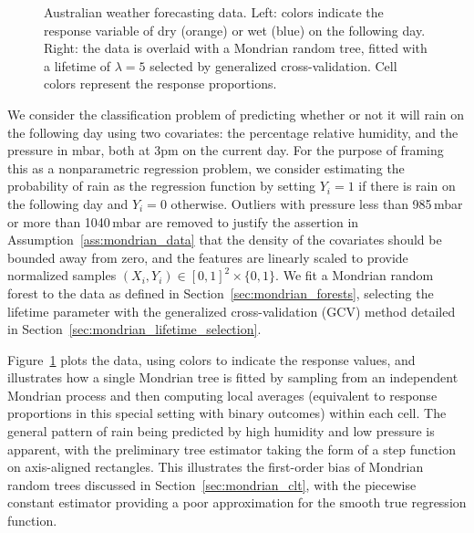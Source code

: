 \begin{figure}[t]
\begin{subfigure}{0.49\textwidth}
  \end{subfigure}
  \caption[Australian weather forecasting data]{
    Australian weather forecasting data. Left: colors indicate the response
    variable of dry (orange) or wet (blue) on the following
    day. Right: the data is overlaid with a Mondrian random tree,
    fitted with a lifetime of $\lambda = 5$
    selected by generalized cross-validation. Cell colors represent the response
  proportions.}
  \label{fig:mondrian_weather_data}
\end{figure}

We consider the classification problem of predicting whether or not it will
rain on the following day using two covariates: the percentage relative
humidity, and the pressure in mbar, both at 3pm on the current day. For the
purpose of framing this as a nonparametric regression problem, we consider
estimating the probability of rain as the regression function by setting
$Y_i = 1$ if there is rain on the following day and $Y_i = 0$ otherwise.
Outliers with pressure less than 985\,mbar or more than 1040\,mbar are removed
to justify the assertion in Assumption~\ref{ass:mondrian_data} that the density
of the covariates should be bounded away from zero, and the features are
linearly scaled to provide normalized samples
$(X_i, Y_i) \in [0, 1]^2 \times \{0, 1\}$.
We fit a Mondrian random forest to the data as defined in
Section~\ref{sec:mondrian_forests}, selecting the lifetime parameter with the
generalized cross-validation (GCV) method detailed in
Section~\ref{sec:mondrian_lifetime_selection}.

Figure~\ref{fig:mondrian_weather_data} plots the
data, using colors to indicate the response values, and illustrates how a
single Mondrian tree is fitted by sampling from an independent Mondrian process
and then computing local averages (equivalent to response proportions in this
special setting with binary outcomes) within each cell. The general pattern of
rain being predicted by high humidity and low pressure is apparent, with the
preliminary tree estimator taking the form of a step function on axis-aligned
rectangles. This illustrates the first-order bias of Mondrian random trees
discussed in Section~\ref{sec:mondrian_clt}, with the piecewise constant
estimator providing a poor approximation for the smooth true regression
function.

